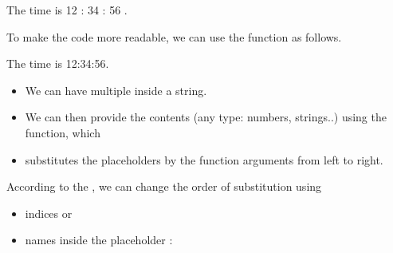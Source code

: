 \documentclass[letterpaper,10pt,english]{sphinxmanual}
\begin{document}
\begin{sphinxVerbatim}[commandchars=\\\{\}]
The time is  12 : 34 : 56 .
\end{sphinxVerbatim}

To make the code more readable, we can use the  function as follows.

\begin{sphinxVerbatim}[commandchars=\\\{\}]
  
\end{sphinxVerbatim}

\begin{sphinxVerbatim}[commandchars=\\\{\}]
The time is 12:34:56.
\end{sphinxVerbatim}
\begin{itemize}
\item {} 
We can have multiple  \sphinxcode{\sphinxupquote{\{\}}} inside a string.

\item {} 
We can then provide the contents (any type: numbers, strings..) using the  function, which

\item {} 
substitutes the place\sphinxhyphen{}holders by the function arguments from left to right.

\end{itemize}

According to the , we can change the order of substitution using
\begin{itemize}
\item {} 
indices  or

\item {} 
names inside the placeholder \sphinxcode{\sphinxupquote{\{\}}}:

\end{itemize}
\end{document}
